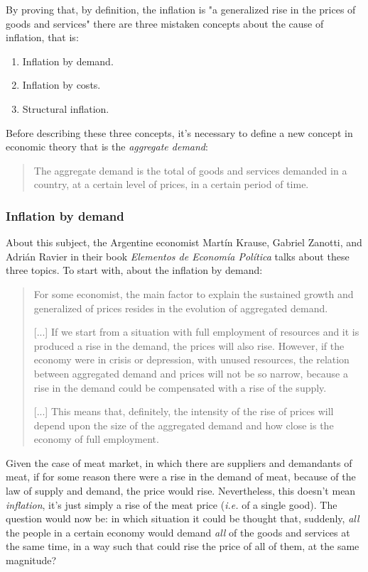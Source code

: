 \documentclass[12pt,a4paper,twoside]{book}
\begin{document}
By proving that, by definition, the inflation is "a generalized rise in the prices of goods and services" there are three mistaken concepts about the cause of inflation, that is:

\begin{enumerate}
\item Inflation by demand.
\item Inflation by costs.
\item Structural inflation.
\end{enumerate}

Before describing these three concepts, it's necessary to define a new concept in economic theory that is the \textit{aggregate demand}:

\begin{quotation}
The aggregate demand is the total of goods and services demanded in a country, at a certain level of prices, in a certain period of time. \cite{epedia:da}
\end{quotation}

\subsubsection{Inflation by demand}
About this subject, the Argentine economist Martín Krause,  Gabriel Zanotti, and Adrián Ravier in their book \textit{Elementos de Economía Política} talks about these three topics. To start with, about the inflation by demand:

\begin{quotation}
For some economist, the main factor to explain the sustained growth and generalized of prices resides in the evolution of aggregated demand.

[...] If we start from a situation with full employment of resources and it is produced a rise in the demand, the prices will also rise. However, if the economy were in crisis or depression, with unused resources, the relation between aggregated demand and prices will not be so narrow, because a rise in the demand could be compensated with a rise of the supply. 

[...] This means that, definitely, the intensity of the rise of prices will depend upon the size of the aggregated demand and how close is the economy of full employment. \cite[p. 465]{elementos-econopol}
\end{quotation}

Given the case of meat market, in which there are suppliers and demandants of meat, if for some reason there were a rise in the demand of meat, because of the law of supply and demand, the price would rise. Nevertheless, this doesn't mean \textit{inflation}, it's just simply a rise of the meat price (\textit{i.e.} of a single good). The question would now be: in which situation it could be thought that, suddenly, \textit{all} the people in a certain economy would demand \textit{all} of the goods and services at the same time, in a way such that could rise the price of all of them, at the same magnitude?
\end{document}
